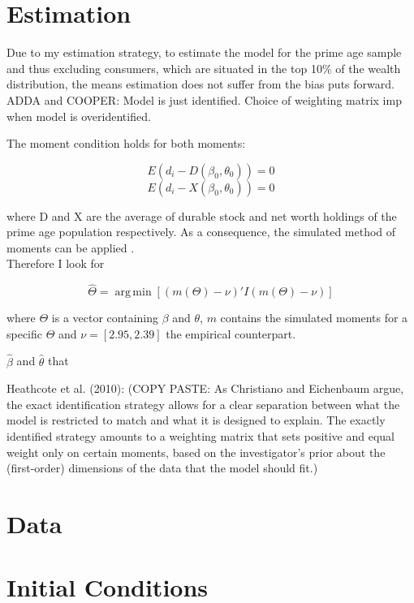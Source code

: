 \documentclass[a4paper,12pt,legno]{article}
\begin{document}
\section{Estimation}
\label{estimation_procedure}

Due to my estimation strategy, to estimate the model for the prime age sample and thus excluding consumers, which are situated in the top 10\% of the wealth distribution, the means estimation does not suffer from the bias \cite{cagetti2003} puts forward. \\  

ADDA and COOPER: 
Model is just identified. Choice of weighting matrix imp when model is overidentified. 

The moment condition holds for both moments: 

\[ E(d_{i} -  D(\beta_{0},\theta_{0})) = 0 \]
\[ E(d_{i} -  X(\beta_{0},\theta_{0})) = 0 \]

where D and X are the average of durable stock and net worth holdings of the prime age population respectively. As a consequence, the simulated method of moments can be applied \citep{duffie1993}.\\

Therefore I look for 

\[ \widehat{\Theta} = \operatorname{arg\,min}[(m(\Theta )-\nu)'I(m(\Theta )-\nu)] \]

where $\Theta$ is a vector containing $\beta$ and $\theta$, $m$ contains the simulated moments for a specific $\Theta$ and $\nu = [2.95,2.39]$ the empirical counterpart. 

$\hat{\beta}$ and $\hat{\theta}$ that 




Heathcote et al. (2010): (COPY PASTE: As Christiano and Eichenbaum argue, the exact identification strategy allows for a clear separation between what the model is restricted to match and what it is designed to explain. The exactly identified strategy amounts to a weighting matrix that sets positive and equal weight only on certain moments, based on the investigator's prior about the (first-order) dimensions of the data that the model should fit.)

\section{Data}
\label{data}



\section{Initial Conditions}
\label{initial_conditions}
\end{document}
